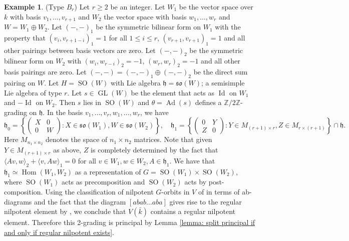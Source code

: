 \documentclass{article} %
\numberwithin{equation}{section}
\theoremstyle{definition}
\newtheorem{example}[proposition]{Example}
\DeclareMathOperator{\GL}{GL}
\DeclareMathOperator{\SO}{SO}
\DeclareMathOperator{\Ad}{Ad}
\DeclareMathOperator{\Id}{Id}
\DeclareMathOperator{\Hom}{Hom}
\newcommand{\Z}{\mathbb{Z}}
\newcommand{\frakh}{\mathfrak h}
\newcommand{\rl}{r} %
\begin{document}
\begin{example}\label{ex-Bn-2grading}(Type $B_{\rl}$)
Let $\rl\geq 2$ be an integer.
Let $W_1$ be the vector space over $k$ with basis $v_1, \dots, v_{\rl+1}$ and $W_2$ the vector space with basis $w_1, \dots, w_\rl$ and $W = W_1\oplus W_2$.
Let $(-,-)_1$ be the symmetric bilinear form on $W_1$ with the property that $(v_i, v_{\rl+1-i})_1 = 1$ for all $1\leq i \leq \rl$, $(v_{\rl+1},v_{\rl+1})_1 = 1$ and all other pairings between basis vectors are zero.
Let $(-,-)_2$ be the symmetric bilinear form on $W_2$ with $(w_i, w_{\rl-i})_2=-1$, $(w_\rl, w_\rl)_2 = -1$ and all other basis pairings are zero.
Let $(-,-) = (-,-)_1 \oplus (-,-)_2$ be the direct sum pairing on $W$.
Let $H = \SO(W)$ with Lie algebra $\frakh = \mathfrak{so}(W)$; a semisimple Lie algebra of type $\rl$.
Let $s\in \GL(W)$ be the element that acts as $\Id$ on $W_1$ and $-\Id$ on $W_2$.
Then $s$ lies in $\SO(W)$ and $\theta=  \Ad(s)$ defines a $\Z/2\Z$-grading on $\frakh$.
In the basis $v_1, \dots, v_\rl, w_1, \dots, w_\rl$, we have
\[
\frakh_0 = 
\left\{
\begin{pmatrix}
    X & 0 \\ 0 & W 
\end{pmatrix}
\colon X \in \mathfrak{so}(W_1), W\in \mathfrak{so}(W_2)
\right\}
, \quad 
\frakh_1 = \left\{
\begin{pmatrix}
    0 & Y \\ Z & 0 
\end{pmatrix}
\colon Y \in M_{(\rl + 1) \times \rl}, Z \in M_{\rl \times (\rl + 1)}
\right\} \cap \frakh.
\]
Here $M_{n_1 \times n_2}$ denotes the space of $n_1 \times n_2$ matrices. Note that given $Y \in M_{(\rl + 1) \times \rl}$ as above, $Z$ is completely determined by the fact that $\langle Av, w\rangle_2 + \langle v, Aw\rangle_1 = 0$ for all $v \in W_1, w \in W_2, A \in \frakh_1$. We have that $\frakh_1 \simeq \Hom(W_1, W_2)$ as a representation of $G = \SO(W_1) \times \SO(W_2)$, where $\SO(W_1)$ acts as precomposition and $\SO(W_2)$ acts by post-composition.
Using the classification of nilpotent $G$-orbits in $V$ of \cite[p. 305, Proposition 2, Case (BDI)]{Ohta-classificationadmissiblenilpotent} in terms of ab-diagrams and the fact that the diagram $[abab\dots aba]$ gives rise to the regular nilpotent element by \cite[Sections 5.1 and 5.4]{CollingwoodMcGovern-nilpotentorbits}, we conclude that $V(\bar{k})$ contains a regular nilpotent element.
Therefore this 2-grading is principal by Lemma \ref{lemma: split principal if and only if regular nilpotent exists}.
\end{example}
\end{document}
